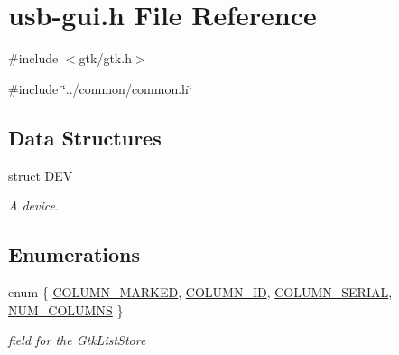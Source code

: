\hypertarget{usb-gui_8h}{
\section{usb-\/gui.h File Reference}
\label{usb-gui_8h}
}
{\ttfamily \#include $<$gtk/gtk.h$>$}\par
{\ttfamily \#include \char`\"{}../common/common.h\char`\"{}}\par
\subsection*{Data Structures}
\begin{DoxyCompactItemize}
\item 
struct \hyperlink{structDEV}{DEV}
\begin{DoxyCompactList}\small\item\em A device. \item\end{DoxyCompactList}\end{DoxyCompactItemize}
\subsection*{Enumerations}
\begin{DoxyCompactItemize}
\item 
enum \{ \hyperlink{usb-gui_8h_a06fc87d81c62e9abb8790b6e5713c55ba237841854e4e21628727932d38fdf4c5}{COLUMN\_\-MARKED}, 
\hyperlink{usb-gui_8h_a06fc87d81c62e9abb8790b6e5713c55bad42963e993a0d76e1a2511cf50b17c79}{COLUMN\_\-ID}, 
\hyperlink{usb-gui_8h_a06fc87d81c62e9abb8790b6e5713c55ba0f37881f7ff6971ea31dad00acbd4510}{COLUMN\_\-SERIAL}, 
\hyperlink{usb-gui_8h_a06fc87d81c62e9abb8790b6e5713c55ba94a1900486855d9c85622e2c106104a9}{NUM\_\-COLUMNS}
 \}
\begin{DoxyCompactList}\small\item\em field for the GtkListStore \item\end{DoxyCompactList}\end{DoxyCompactItemize}
